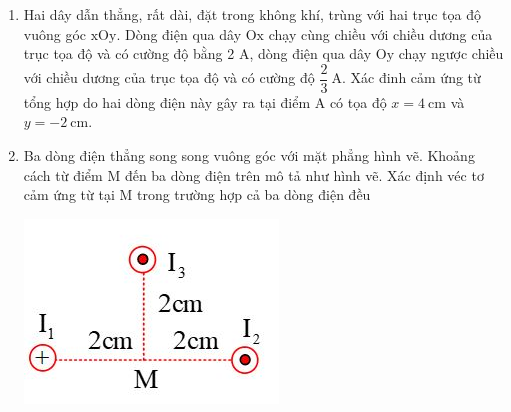 \begin{enumerate}
{		d) Điểm N cách dây 1 đoạn 8 cm và cách dây 2 đoạn 6 cm
		
	}
	\item {Hai dây dẫn thẳng, rất dài, đặt trong không khí, trùng với hai trục tọa độ vuông góc $\text{xOy}$. Dòng điện qua dây $\text{Ox}$ chạy cùng chiều với chiều dương của trục tọa độ và có cường độ bằng 2 A, dòng điện qua dây $\text{Oy}$ chạy ngược chiều với chiều dương của trục tọa độ và có cường độ $\dfrac{2}{3}\ \text{A}$. Xác đinh cảm ứng từ tổng hợp do hai dòng điện này gây ra tại điểm A có tọa độ $x = 4\ \text{cm}$ và $y = -2\ \text{cm}$.
	}
	\item {Ba dòng điện thẳng song song vuông góc với mặt phẳng hình vẽ. Khoảng cách từ điểm M đến ba dòng điện trên mô tả như hình vẽ. Xác định véc tơ cảm ứng từ tại M trong trường hợp cả ba dòng điện đều 
		\begin{center}
			\includegraphics[scale=0.6]{../figs/VN11-PH-26-P-017-1-4.JPG}
		\end{center}
		}
\end{enumerate}

